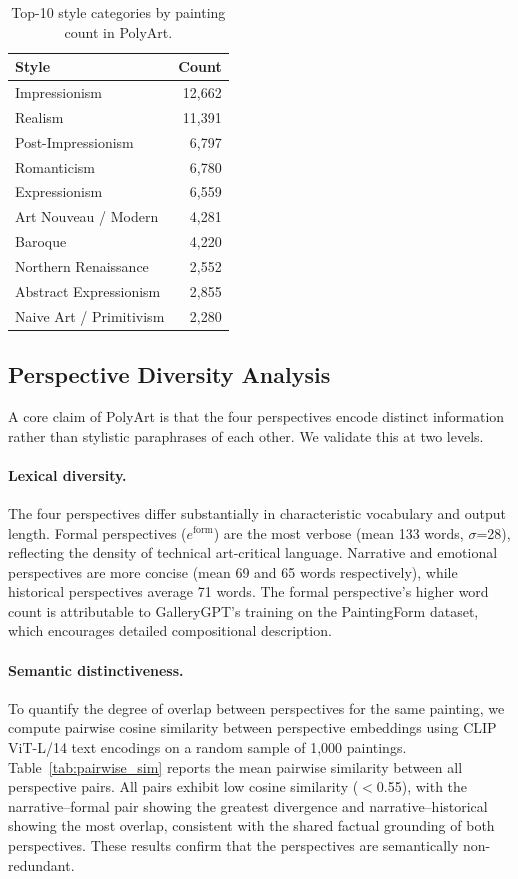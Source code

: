 \begin{table}[h]
\centering
\caption{Top-10 style categories by painting count in PolyArt.}
\label{tab:style_dist}
\begin{tabular}{lr}
\toprule
\textbf{Style} & \textbf{Count} \\
\midrule
Impressionism          & 12,662 \\
Realism                & 11,391 \\
Post-Impressionism     & 6,797  \\
Romanticism            & 6,780  \\
Expressionism          & 6,559  \\
Art Nouveau / Modern   & 4,281  \\
Baroque                & 4,220  \\
Northern Renaissance   & 2,552  \\
Abstract Expressionism & 2,855  \\
Naive Art / Primitivism & 2,280 \\
\bottomrule
\end{tabular}
\end{table}

\subsection{Perspective Diversity Analysis}

A core claim of PolyArt is that the four perspectives encode distinct information rather than stylistic paraphrases of each other.
We validate this at two levels.

\paragraph{Lexical diversity.}
The four perspectives differ substantially in characteristic vocabulary and output length.
Formal perspectives ($e^{\text{form}}$) are the most verbose (mean 133 words, $\sigma$=28), reflecting the density of technical art-critical language.
Narrative and emotional perspectives are more concise (mean 69 and 65 words respectively), while historical perspectives average 71 words.
The formal perspective's higher word count is attributable to GalleryGPT's training on the PaintingForm dataset, which encourages detailed compositional description.

\paragraph{Semantic distinctiveness.}
To quantify the degree of overlap between perspectives for the same painting, we compute pairwise cosine similarity between perspective embeddings using CLIP ViT-L/14 text encodings on a random sample of 1,000 paintings.
Table~\ref{tab:pairwise_sim} reports the mean pairwise similarity between all perspective pairs.
All pairs exhibit low cosine similarity ($<$0.55), with the narrative--formal pair showing the greatest divergence and narrative--historical showing the most overlap, consistent with the shared factual grounding of both perspectives.
These results confirm that the perspectives are semantically non-redundant.

